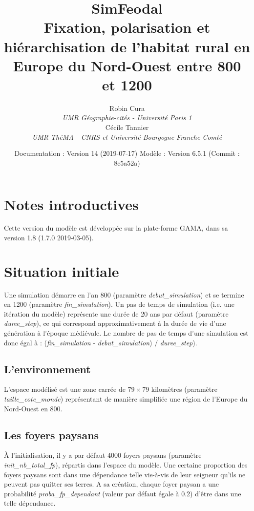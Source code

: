\documentclass[a4paper,11pt]{article}
\title{\textbf{SimFeodal}\\Fixation, polarisation et hiérarchisation de l'habitat rural en Europe du Nord-Ouest entre 800 et 1200}
\author{Robin Cura \\\textit{UMR Géographie-cités - Université Paris 1} \\ Cécile Tannier \\ \textit{UMR ThéMA - CNRS et Université Bourgogne Franche-Comté}}
\date{Documentation : Version 14 (2019-07-17)\linebreak
	Modèle : Version 6.5.1 (Commit : 8c5a52a)
}
\begin{document}
\maketitle
\tableofcontents

\section{Notes introductives}
Cette version du modèle est développée sur la plate-forme GAMA, dans sa version 1.8 (1.7.0 2019-03-05).


\section{Situation initiale}
Une simulation démarre en l'an 800 (paramètre \textit{debut\_simulation}) et se termine en 1200 (paramètre \textit{fin\_simulation}). Un pas de temps de simulation (i.e. une itération du modèle) représente une durée de 20 ans par défaut (paramètre \textit{duree\_step}), ce qui correspond approximativement à la durée de vie d'une génération à l'époque médiévale. Le nombre de pas de temps d'une simulation est donc égal à : (\textit{fin\_simulation} - \textit{debut\_simulation}) / \textit{duree\_step}).

\subsection{L'environnement}
L'espace modélisé est une zone carrée de $79 \times 79$ kilomètres (paramètre \textit{taille\_cote\_monde}) représentant de manière simplifiée une région de l'Europe du Nord-Ouest en 800.

\subsection{Les foyers paysans}
\begin{sloppypar}
À l'initialisation, il y a par défaut 4000 foyers paysans (paramètre \textit{init\_nb\_total\_fp}), répartis dans l'espace du modèle. Une certaine proportion des foyers paysans sont dans une dépendance telle vis-à-vis de leur seigneur qu'ils ne peuvent pas quitter ses terres. A sa création, chaque foyer paysan a une probabilité \textit{proba\_fp\_dependant} (valeur par défaut égale à 0.2) d'être dans une telle dépendance.
\end{sloppypar}
\end{document}
